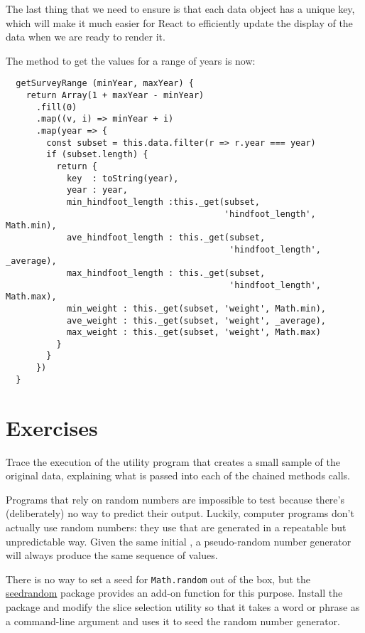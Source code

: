 The last thing that we need to ensure is that each data object has a unique key,
which will make it much easier for React to efficiently update the display of
the data when we are ready to render it.

The method to get the values for a range of years is now:

\begin{verbatim}
  getSurveyRange (minYear, maxYear) {
    return Array(1 + maxYear - minYear)
      .fill(0)
      .map((v, i) => minYear + i)
      .map(year => {
        const subset = this.data.filter(r => r.year === year)
        if (subset.length) {
          return {
            key  : toString(year),
            year : year,
            min_hindfoot_length :this._get(subset,
                                           'hindfoot_length', Math.min),
            ave_hindfoot_length : this._get(subset,
                                            'hindfoot_length', _average),
            max_hindfoot_length : this._get(subset,
                                            'hindfoot_length', Math.max),
            min_weight : this._get(subset, 'weight', Math.min),
            ave_weight : this._get(subset, 'weight', _average),
            max_weight : this._get(subset, 'weight', Math.max)
          }
        }
      })
  }
\end{verbatim}

\section{Exercises}\label{s:dataman-exercises}


Trace the execution of the utility program that creates a small sample of the original data,
explaining what is passed into each of the chained methods calls.


Programs that rely on random numbers are impossible to test
because there's (deliberately) no way to predict their output.
Luckily, computer programs don't actually use random numbers:
they use 
that are generated in a repeatable but unpredictable way.
Given the same initial ,
a pseudo-random number generator will always produce the same sequence of values.

There is no way to set a seed for \texttt{Math.random} out of the box,
but the \href{https://www.npmjs.com/package/seedrandom}{seedrandom} package provides an add-on function for this purpose.
Install the package and modify the slice selection utility
so that it takes a word or phrase as a command-line argument
and uses it to seed the random number generator.

